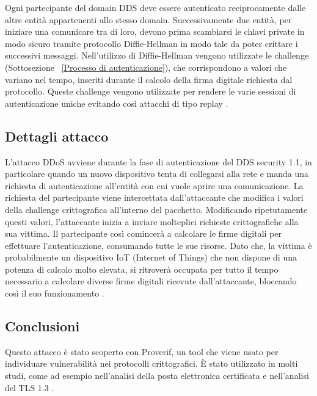 Ogni partecipante del domain DDS deve essere autenticato reciprocamente
dalle altre entità appartenenti allo stesso domain.
Successivamente due entità,
per iniziare una comunicare tra di loro, devono prima
scambiarsi le chiavi private
in modo
sicuro tramite protocollo Diffie-Hellman in modo tale da poter 
crittare i successivi
messaggi. Nell'utilizzo di Diffie-Hellman vengono utilizzate
le challenge (Sottosezione ~\ref{Processo di autenticazione}), 
che corrispondono a valori che variano nel tempo, 
inseriti durante il calcolo
della firma digitale richiesta dal protocollo. 
Queste challenge vengono utilizzate per rendere le varie sessioni 
di autenticazione uniche evitando così attacchi di tipo replay
\cite{DBLP:conf/asiaccs/WangLG24}.



\subsection{Dettagli attacco}
L'attacco DDoS avviene durante la fase di autenticazione del
DDS security 1.1, in particolare quando un nuovo dispositivo tenta di
collegarsi alla rete e manda una richiesta di autenticazione
all'entità con cui vuole aprire una comunicazione. 
La richiesta del partecipante viene intercettata
dall'attaccante che modifica i valori della challenge crittografica 
all'interno del pacchetto. Modificando ripetutamente questi valori, l'attaccante
inizia a inviare molteplici richieste crittografiche alla sua vittima.
Il partecipante così comincerà a calcolare le firme digitali per effettuare
l'autenticazione, consumando tutte le sue risorse.
Dato che, la vittima è probabilmente un dispositivo IoT
(Internet of Things)
che non dispone di una potenza di calcolo molto elevata, si ritroverà
occupata per tutto il tempo necessario a calcolare diverse firme digitali
ricevute dall'attaccante, bloccando così il suo funzionamento
\cite{DBLP:conf/asiaccs/WangLG24}.


\subsection{Conclusioni}
Questo attacco è stato scoperto con Proverif, un tool che viene usato
per individuare vulnerabilità nei protocolli crittografici. 
È stato utilizzato in molti studi, come ad esempio nell'analisi della 
posta elettronica certificata e nell'analisi del TLS 1.3 \cite{proverifmanual}.

